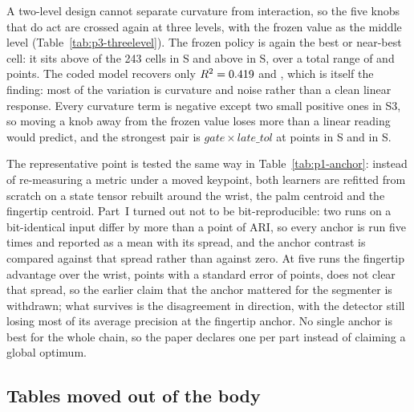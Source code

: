 A two-level design cannot separate curvature from interaction, so the five knobs that do
act are crossed again at three levels, with the frozen value as the middle level
(Table~\ref{tab:p3-threelevel}). The frozen policy is again the best or near-best cell: it
sits above \slotPThreeAboveSTwo{} of the 243 cells in S\slotCaseTwo{} and above
\slotPThreeAboveSThree{} in S\slotCaseThree{}, over a total range of
\slotPThreeRangeSTwo{} and \slotPThreeRangeSThree{} points. The coded model recovers only
$R^2=0.419$ and \slotPThreeRTwoSThree{}, which is itself the finding: most of
the variation is curvature and noise rather than a clean linear response. Every curvature
term is negative except two small positive ones in S3, so moving a knob away from the
frozen value loses more than a linear reading would predict, and the strongest pair is
$gate\times late\_tol$ at \slotPThreeInterSTwo{} points in S\slotCaseTwo{} and
\slotPThreeInterSThree{} in S\slotCaseThree{}.

The representative point is tested the same way in Table~\ref{tab:p1-anchor}: instead of
re-measuring a metric under a moved keypoint, both learners are refitted from scratch on a
state tensor rebuilt around the wrist, the palm centroid and the fingertip centroid. Part~I
turned out not to be bit-reproducible: two runs on a bit-identical input differ by more than
a point of ARI, so every anchor is run five times and reported as a mean with its spread,
and the anchor contrast is compared against that spread rather than against zero. At five
runs the fingertip advantage over the wrist, \slotPAnchorTipsMinusWrist{} points with a
standard error of \slotPAnchorSE{} points, does not clear that spread, so the earlier claim
that the anchor mattered for the segmenter is withdrawn; what survives is the disagreement in
direction, with the detector still losing most of its average precision at the fingertip
anchor. No single anchor is best for the whole chain, so the paper declares one per part
instead of claiming a global optimum.








\subsection{Tables moved out of the body}

